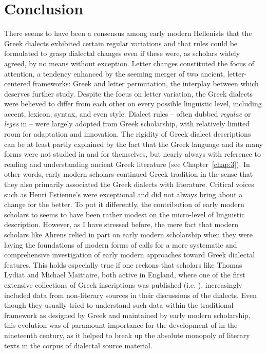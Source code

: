 \section{Conclusion}\label{sec:6.5}

There seems to have been a consensus among early modern Hellenists that the Greek dialects exhibited certain regular variations and that rules could be formulated to grasp dialectal changes even if these were, as scholars widely agreed, by no means without exception. Letter changes constituted the focus of attention, a tendency enhanced by the seeming merger of two ancient, letter-centered frameworks: Greek  and  letter permutation, the interplay between which deserves further study. Despite the focus on letter variation, the Greek dialects were believed to differ from each other on every possible linguistic level, including accent, lexicon, syntax, and even style. Dialect rules – often dubbed \textit{regulae} or \textit{leges} in  – were largely adopted from Greek scholarship, with relatively limited room for adaptation and innovation. The rigidity of Greek dialect descriptions can be at least partly explained by the fact that the Greek language and its many forms were not studied in and for themselves, but nearly always with reference to reading and understanding ancient Greek literature (see Chapter~\ref{chap:3}). In other words, early modern scholars continued Greek tradition in the sense that they also primarily associated the Greek dialects with literature. Critical voices such as Henri Estienne’s were exceptional and did not always bring about a change for the better. To put it differently, the contribution of early modern scholars to   seems to have been rather modest on the micro-level of linguistic description. However, as I have stressed before, the mere fact that modern scholars like Ahrens relied in part on early modern scholarship when they were laying the foundations of modern forms of   calls for a more systematic and comprehensive investigation of early modern approaches toward Greek dialectal features. This holds especially true if one reckons that scholars like Thomas Lydiat and Michael Maittaire, both active in England, where one of the first extensive collections of Greek inscriptions was published (i.e. \citealt{Prideaux1676}), increasingly included data from non-literary sources in their discussions of the dialects. Even though they usually tried to understand such data within the traditional framework as designed by Greek and maintained by early modern scholarship, this evolution was of paramount importance for the development of   in the nineteenth century, as it helped to break up the absolute monopoly of literary texts in the corpus of dialectal source material.

